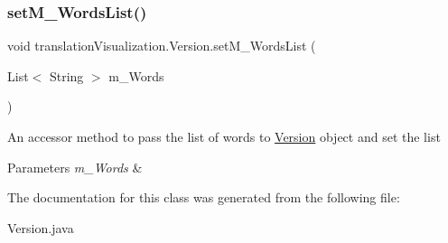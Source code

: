 \subsubsection{\texorpdfstring{set\+M\+\_\+\+Words\+List()}{setM\_WordsList()}}
{\footnotesize\ttfamily void translation\+Visualization.\+Version.\+set\+M\+\_\+\+Words\+List (\begin{DoxyParamCaption}\item[{List$<$ String $>$}]{m\+\_\+\+Words }\end{DoxyParamCaption})\hspace{0.3cm}{\ttfamily [inline]}}

An accessor method to pass the list of words to \hyperlink{classtranslation_visualization_1_1_version}{Version} object and set the list 
\begin{DoxyParams}{Parameters}
{\em m\+\_\+\+Words} & \\
\hline
\end{DoxyParams}


The documentation for this class was generated from the following file\+:\begin{DoxyCompactItemize}
\item 
Version.\+java\end{DoxyCompactItemize}
